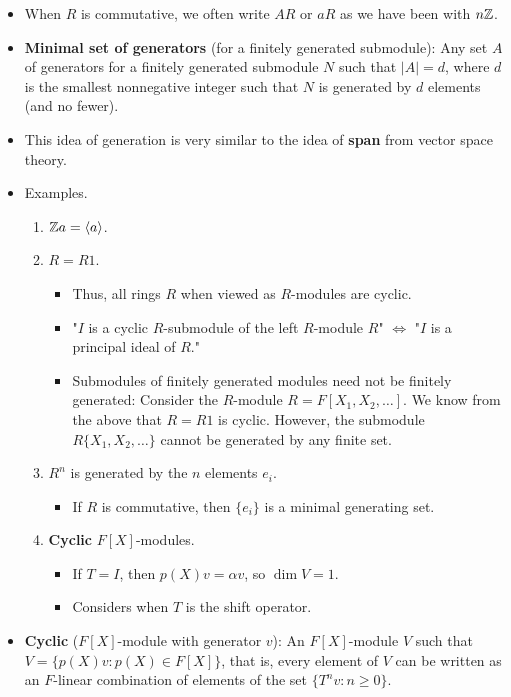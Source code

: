 \documentclass[../notes.tex]{subfiles}
\begin{document}
\begin{itemize}
\begin{itemize}
    \end{itemize}
    \item When $R$ is commutative, we often write $AR$ or $aR$ as we have been with $n\mathbb{Z}$.
    \item \textbf{Minimal set of generators} (for a finitely generated submodule): Any set $A$ of generators for a finitely generated submodule $N$ such that $|A|=d$, where $d$ is the smallest nonnegative integer such that $N$ is generated by $d$ elements (and no fewer).
    \item This idea of generation is very similar to the idea of \textbf{span} from vector space theory.
    \item Examples.
    \begin{enumerate}
        \item $\mathbb{Z} a=\left\langle{a}\right\rangle$.
        \item $R=R1$.
        \begin{itemize}
            \item Thus, all rings $R$ when viewed as $R$-modules are cyclic.
            \item "$I$ is a cyclic $R$-submodule of the left $R$-module $R$" $\Longleftrightarrow$ "$I$ is a principal ideal of $R$."
            \item Submodules of finitely generated modules need not be finitely generated: Consider the $R$-module $R=F[X_1,X_2,\dots]$. We know from the above that $R=R1$ is cyclic. However, the submodule $R\{X_1,X_2,\dots\}$ cannot be generated by any finite set.
        \end{itemize}
        \item $R^n$ is generated by the $n$ elements $e_i$.
        \begin{itemize}
            \item If $R$ is commutative, then $\{e_i\}$ is a minimal generating set.
        \end{itemize}
        \item {}\textbf{Cyclic} $F[X]$-modules.
        \begin{itemize}
            \item If $T=I$, then $p(X)v=\alpha v$, so $\dim V=1$.
            \item Considers when $T$ is the shift operator.
        \end{itemize}
    \end{enumerate}
    \item \textbf{Cyclic} ($F[X]$-module with generator $v$): An $F[X]$-module $V$ such that $V=\{p(X)v:p(X)\in F[X]\}$, that is, every element of $V$ can be written as an $F$-linear combination of elements of the set $\{T^nv:n\geq 0\}$.

\end{itemize}
\end{document}

